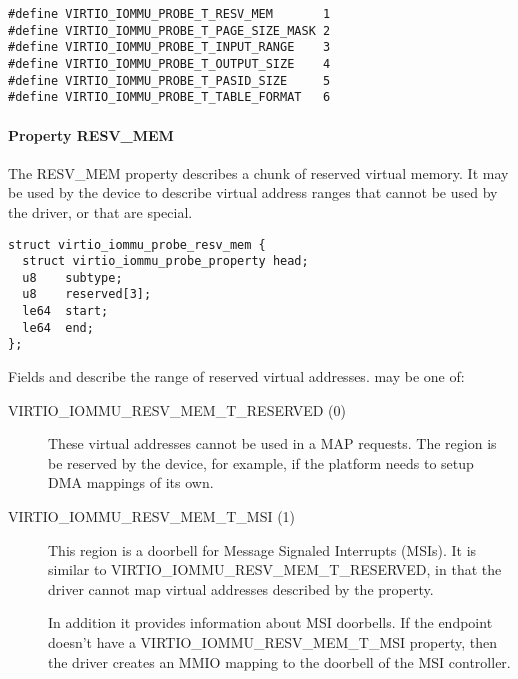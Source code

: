 \begin{lstlisting}
#define VIRTIO_IOMMU_PROBE_T_RESV_MEM       1
#define VIRTIO_IOMMU_PROBE_T_PAGE_SIZE_MASK 2
#define VIRTIO_IOMMU_PROBE_T_INPUT_RANGE    3
#define VIRTIO_IOMMU_PROBE_T_OUTPUT_SIZE    4
#define VIRTIO_IOMMU_PROBE_T_PASID_SIZE     5
#define VIRTIO_IOMMU_PROBE_T_TABLE_FORMAT   6
\end{lstlisting}

\paragraph{Property RESV_MEM}\label{sec:Device Types / IOMMU Device / Device operations / PROBE properties / RESVMEM}

The RESV_MEM property describes a chunk of reserved virtual memory. It may
be used by the device to describe virtual address ranges that cannot be
used by the driver, or that are special.

\begin{lstlisting}
struct virtio_iommu_probe_resv_mem {
  struct virtio_iommu_probe_property head;
  u8    subtype;
  u8    reserved[3];
  le64  start;
  le64  end;
};
\end{lstlisting}

Fields  and  describe the range of reserved virtual
addresses.  may be one of:

\begin{description}
  \item[VIRTIO_IOMMU_RESV_MEM_T_RESERVED (0)]
    These virtual addresses cannot be used in a MAP requests. The region
    is be reserved by the device, for example, if the platform needs to
    setup DMA mappings of its own.

  \item[VIRTIO_IOMMU_RESV_MEM_T_MSI (1)]
    This region is a doorbell for Message Signaled Interrupts (MSIs). It
    is similar to VIRTIO_IOMMU_RESV_MEM_T_RESERVED, in that the driver
    cannot map virtual addresses described by the property.

    In addition it provides information about MSI doorbells. If the
    endpoint doesn't have a VIRTIO_IOMMU_RESV_MEM_T_MSI property, then the
    driver creates an MMIO mapping to the doorbell of the MSI controller.
\end{description}


